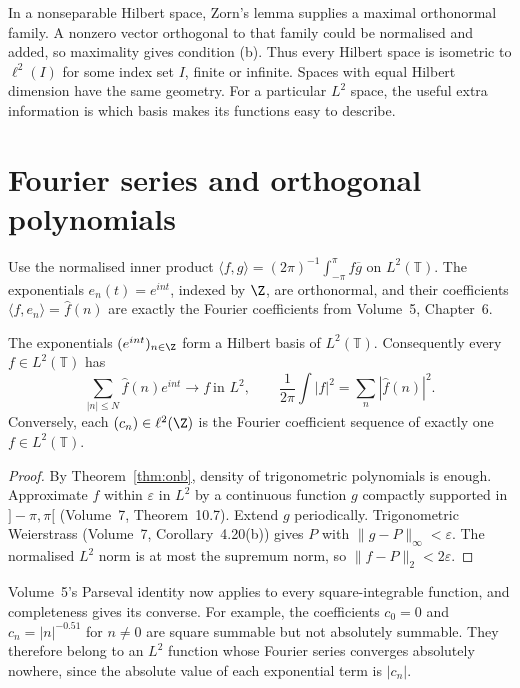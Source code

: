 In a nonseparable Hilbert space, Zorn's lemma supplies a maximal orthonormal family. A nonzero vector orthogonal to that family could be normalised and added, so maximality gives condition (b). Thus every Hilbert space is isometric to $\ell^2(I)$ for some index set $I$, finite or infinite. Spaces with equal Hilbert dimension have the same geometry. For a particular $L^2$ space, the useful extra information is which basis makes its functions easy to describe.

\section{Fourier series and orthogonal polynomials}


Use the normalised inner product $\langle f,g\rangle=(2\pi)^{-1}\int_{-\pi}^\pi f\overline g$ on $L^2(\mathbb T)$. The exponentials $e_n(t)=e^{int}$, indexed by $\Z$, are orthonormal, and their coefficients $\langle f,e_n\rangle=\hat f(n)$ are exactly the Fourier coefficients from Volume~5, Chapter~6.

\begin{theorem}\label{thm:fourierl2}
The exponentials $(e^{int})_{n\in\Z}$ form a Hilbert basis of $L^2(\mathbb T)$. Consequently every $f\in L^2(\mathbb T)$ has
\[\sum_{|n|\le N}\hat f(n)e^{int}\longrightarrow f\ \text{in }L^2,\qquad\frac1{2\pi}\int|f|^2=\sum_n|\hat f(n)|^2.\]
Conversely, each $(c_n)\in\ell^2(\Z)$ is the Fourier coefficient sequence of exactly one $f\in L^2(\mathbb T)$.
\end{theorem}
\begin{proof}
By Theorem~\ref{thm:onb}, density of trigonometric polynomials is enough. Approximate $f$ within $\varepsilon$ in $L^2$ by a continuous function $g$ compactly supported in $]-\pi,\pi[$ (Volume~7, Theorem~10.7). Extend $g$ periodically. Trigonometric Weierstrass (Volume~7, Corollary~4.20(b)) gives $P$ with $\|g-P\|_\infty<\varepsilon$. The normalised $L^2$ norm is at most the supremum norm, so $\|f-P\|_2<2\varepsilon$.
\end{proof}

Volume~5's Parseval identity now applies to every square-integrable function, and completeness gives its converse. For example, the coefficients $c_0=0$ and $c_n=|n|^{-0.51}$ for $n\ne0$ are square summable but not absolutely summable. They therefore belong to an $L^2$ function whose Fourier series converges absolutely nowhere, since the absolute value of each exponential term is $|c_n|$.


